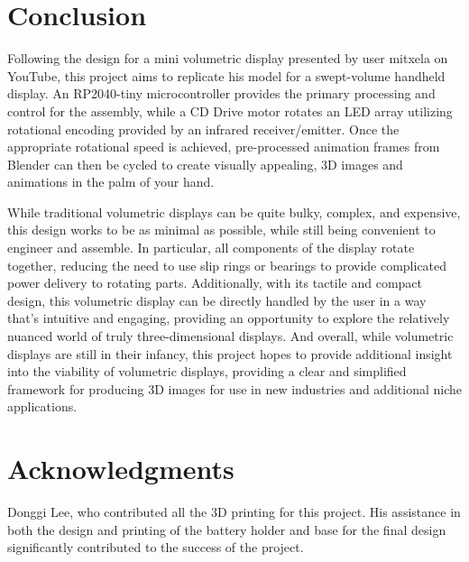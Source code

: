 \documentclass[11pt,journal]{IEEEtran}
\begin{document}
 
\section{Conclusion}
Following the design for a mini volumetric display presented by user mitxela on YouTube, this project aims to replicate his model for a swept-volume handheld display. An RP2040-tiny microcontroller provides the primary processing and control for the assembly, while a CD Drive motor rotates an LED array utilizing rotational encoding provided by an infrared receiver/emitter. Once the appropriate rotational speed is achieved, pre-processed animation frames from Blender can then be cycled to create visually appealing, 3D images and animations in the palm of your hand.

While traditional volumetric displays can be quite bulky, complex, and expensive, this design works to be as minimal as possible, while still being convenient to engineer and assemble. In particular, all components of the display rotate together, reducing the need to use slip rings or bearings to provide complicated power delivery to rotating parts. Additionally, with its tactile and compact design, this volumetric display can be directly handled by the user in a way that’s intuitive and engaging, providing an opportunity to explore the relatively nuanced world of truly three-dimensional displays. And overall, while volumetric displays are still in their infancy, this project hopes to provide additional insight into the viability of volumetric displays, providing a clear and simplified framework for producing 3D images for use in new industries and additional niche applications.



\section*{Acknowledgments}

  Donggi Lee, who contributed all the 3D printing for this project. His assistance in both the design and printing of the battery holder and base for the final design significantly contributed to the success of the project.



\end{document}
